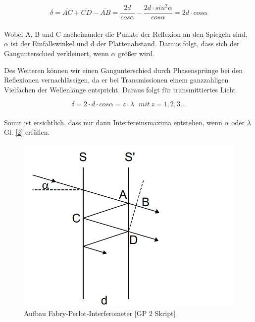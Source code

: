 \documentclass{article}
\begin{document}
\begin{equation}
\label{1}
\delta = \overline{AC} + \overline{CD} - \overline{AB}= \frac{2d}{cos \alpha}- \frac {2d \cdot sin^2 \alpha}{cos \alpha} =2d\cdot cos \alpha
\end{equation}\\

Wobei A, B und C nacheinander die Punkte der Reflexion an den Spiegeln sind, \(\alpha \) ist der Einfallswinkel und d der Plattenabstand. Daraus folgt, dass sich der Gangunterschied verkleinert, wenn \(\alpha \) größer wird.

Des Weiteren können wir einen Gangunterschied durch Phasensprünge bei den Reflexionen vernachlässigen, da er bei Transmissionen einem ganzzahligen Vielfachen der Wellenlänge entspricht. Daraus folgt für transmittiertes Licht

\begin{equation}
\label{2}
\delta = 2 \cdot d \cdot cos \alpha = z \cdot \lambda \ \ \ mit\ z=1,2,3...
\end{equation}\\

Somit ist ersichtlich, dass nur dann Interfereinsmaxima entstehen, wenn \(\alpha \) oder \(\lambda \) Gl. \eqref{2} erfüllen.
\begin{figure}[htbp]
\centering
\includegraphics[scale=0.3]{FAP1.png}
\begin{center}
\caption{Aufbau Fabry-Perlot-Interferometer [GP 2 Skript]}
\end{center}
\end{figure}
\end{document}

